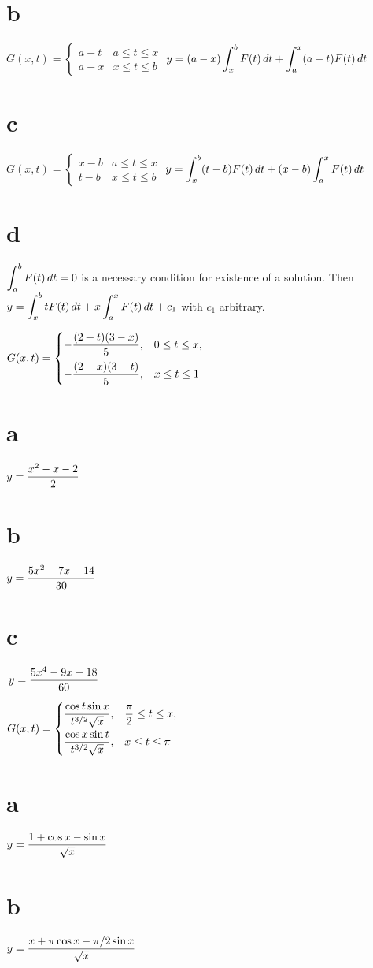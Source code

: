 \part{b}\;
$G(x,t)=
\begin{cases}
a-t & a\le t\le x\\
a-x &x\le t\le b
\end{cases}$  \quad
$y=\displaystyle{(a-x)\int_{x}^{b}F(t)\,dt+\int_{a}^{x}(a-t)F(t)\,dt}$
\part{c}\;
$G(x,t)=
\begin{cases}
x-b & a\le t\le x\\
t-b &x\le t\le b
\end{cases}$  \quad
$y=\displaystyle{\int_{x}^{b}(t-b)F(t)\,dt+(x-b)\int_{a}^{x}F(t)\,dt}$
\part{d}\;
$\displaystyle{\int_{a}^{b}F(t)\,dt=0}$ is a necessary condition for existence of a
solution. Then $y=\displaystyle{\int_{x}^{b}tF(t)\,dt+x\int_{a}^{x}F(t)\,dt+c_{1}}$
with $c_{1}$ arbitrary.

\smallskip
{}
$G(x,t)=
\begin{cases}
\displaystyle{-\frac{(2+t)(3-x)}{5}},& 0\le t\le x,\\[.11in]
-\displaystyle{\frac{(2+x)(3-t)}{5}}, &x\le t\le 1
\end{cases}$
\;  \part{a} $y=\displaystyle{\frac{x^{2}-x-2}{2}}$
\;  \part{b} $y=\displaystyle{\frac{5x^{2}-7x-14}{30}}$
\part{c}$\, y=\displaystyle{\frac{5x^{4}-9x-18}{60}}$

\smallskip
{}
$G(x,t)=
\begin{cases}
\displaystyle{\frac{\cos t\sin x}{t^{3/2}\sqrt{x}}}, &\displaystyle{\frac{\pi}{2}}\le t\le
x,\\[.11in]
\displaystyle{\frac{\cos x\sin t}{t^{3/2}\sqrt{x}}}, &x\le t\le \pi
\end{cases}$
\;  \part{a}\;   $y=\displaystyle{\frac{1+\cos x-\sin x}{\sqrt x}}$
\;  \part{b}\;   $y=\displaystyle{\frac{x+\pi \cos x-\pi/2\sin x}{\sqrt x}}$

